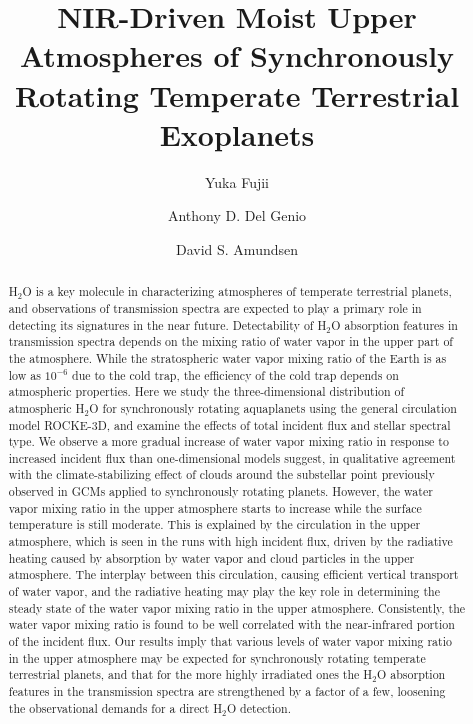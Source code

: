 \documentclass[11pt,numberedappendix,twocolappendix,]{emulateapj}
\def\water{H$_2$O}
\def\wv{water vapor}
\begin{document}

\title{NIR-Driven Moist Upper Atmospheres of Synchronously Rotating Temperate Terrestrial Exoplanets}

\author{Yuka Fujii}

\author{Anthony D. Del Genio}

\author{David S. Amundsen}


\begin{abstract}
%
\water{} is a key molecule in characterizing atmospheres of temperate terrestrial planets, and observations of transmission spectra are expected to play a primary role in detecting its signatures in the near future. 
%
Detectability of \water{} absorption features in transmission spectra depends on the mixing ratio of \wv{} in the upper part of the atmosphere. 
%
While the stratospheric \wv{} mixing ratio of the Earth is as low as $10^{-6}$ due to the cold trap, the efficiency of the cold trap depends on atmospheric properties. 
%
Here we study the three-dimensional distribution of atmospheric \water{} for synchronously rotating aquaplanets using the general circulation model ROCKE-3D, and examine the effects of total incident flux and stellar spectral type.  
%
We observe a more gradual increase of \wv{} mixing ratio in response to increased incident flux than one-dimensional models suggest, in qualitative agreement with the climate-stabilizing effect of clouds around the substellar point previously observed in GCMs applied to synchronously rotating planets. 
%
However, the \wv{} mixing ratio in the upper atmosphere starts to increase  while the surface temperature is still moderate. 
%
This is explained by the circulation in the upper atmosphere, which is seen in the runs with high incident flux, driven by the radiative heating caused by absorption by \wv{} and cloud particles in the upper atmosphere. 
%
The interplay between this circulation, causing efficient vertical transport of \wv{}, and the radiative heating may play the key role in determining the steady state of the \wv{} mixing ratio in the upper atmosphere. 
%
Consistently, the \wv{} mixing ratio is found to be well correlated with the near-infrared portion of the incident flux. 
%
Our results imply that various levels of \wv{} mixing ratio in the upper atmosphere may be expected for synchronously rotating temperate terrestrial planets, and that for the more highly irradiated ones the \water{} absorption features in the transmission spectra are strengthened by a factor of a few, loosening the observational demands for a direct \water{} detection. 
%
\end{abstract}
\end{document}
